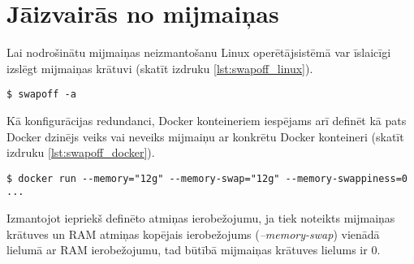 \section{Jāizvairās no mijmaiņas}
Lai nodrošinātu mijmaiņas neizmantošanu Linux operētājsistēmā var īslaicīgi
izslēgt mijmaiņas krātuvi (skatīt izdruku \ref{lst:swapoff_linux}).
\begin{lstlisting}[caption={Mijmaiņas krātuves izlēgšana uz Linux}, label=lst:swapoff_linux]
$ swapoff -a
\end{lstlisting}

Kā konfigurācijas redundanci, Docker konteineriem iespējams arī definēt kā pats
Docker dzinējs veiks vai neveiks mijmaiņu ar konkrētu Docker konteineri (skatīt
izdruku \ref{lst:swapoff_docker}).

\begin{lstlisting}[caption={Mijmaiņas krātuves izlēgšana Docker konteinerim},
    label=lst:swapoff_docker]
$ docker run --memory="12g" --memory-swap="12g" --memory-swappiness=0 ...
\end{lstlisting}

Izmantojot iepriekš definēto atmiņas ierobežojumu, ja tiek noteikts mijmaiņas
krātuves un RAM atmiņas kopējais ierobežojums (\textit{--memory-swap}) vienādā
lielumā ar RAM ierobežojumu, tad būtībā mijmaiņas krātuves lielums ir 0.

